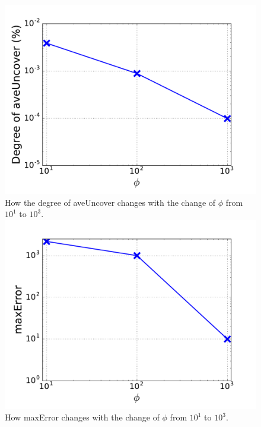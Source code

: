 \begin{figure}[!htb]
  \includegraphics[width=\linewidth]{figure/aveUncover.pdf}
  {How the degree of aveUncover changes with the change of $\phi$ from $10^1$ to $10^3$.}
\endminipage\hfill
{}%
  \includegraphics[width=\linewidth]{figure/maxError.pdf}
  {How maxError changes with the change of $\phi$ from $10^1$ to $10^3$.}

\endminipage
\end{figure}